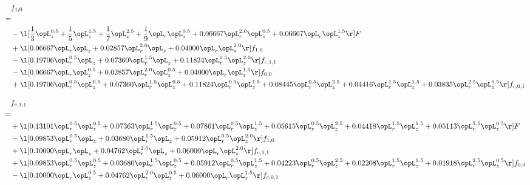 \begin{alignat}{2} 
\label{eq:f_10_1} 
& f_{1,0} \nonumber \\ 
 = \\ 
& - \l[ \frac{1}{3} \opL_z^{0.5} + \frac{1}{5} \opL_z^{1.5} + \frac{1}{7} \opL_z^{2.5} + \frac{1}{9} \opL_r \opL_z^{0.5} +  0.06667 \opL_r^{2.0} \opL_z^{0.5} +  0.06667 \opL_r \opL_z^{1.5}  \r] F \nonumber \\ 
& + \l[  0.06667 \opL_r \opL_z +  0.02857 \opL_r^{2.0} \opL_z +  0.04000 \opL_r \opL_z^{2.0}  \r] f_{1,0} \nonumber \\ 
& - \l[  0.19706 \opL_r^{0.5} \opL_z +  0.07360 \opL_r^{1.5} \opL_z +  0.11824 \opL_r^{0.5} \opL_z^{2.0}  \r] f_{c,1,1} \nonumber \\ 
& - \l[  0.06667 \opL_r \opL_z^{0.5} +  0.02857 \opL_r^{2.0} \opL_z^{0.5} +  0.04000 \opL_r \opL_z^{1.5}  \r] f_{0,0} \nonumber \\ 
& + \l[  0.19706 \opL_r^{0.5} \opL_z^{0.5} +  0.07360 \opL_r^{1.5} \opL_z^{0.5} +  0.11824 \opL_r^{0.5} \opL_z^{1.5} +  0.08445 \opL_r^{0.5} \opL_z^{2.5} +  0.04416 \opL_r^{1.5} \opL_z^{1.5} +  0.03835 \opL_r^{2.5} \opL_z^{0.5}  \r] f_{c,0,1} \nonumber \\ 
\end{alignat} 


\begin{alignat}{2} 
\label{eq:f_11_1} 
& f_{c,1,1} \nonumber \\ 
 = \\ 
& + \l[  0.13101 \opL_r^{0.5} \opL_z^{0.5} +  0.07363 \opL_r^{1.5} \opL_z^{0.5} +  0.07861 \opL_r^{0.5} \opL_z^{1.5} +  0.05615 \opL_r^{0.5} \opL_z^{2.5} +  0.04418 \opL_r^{1.5} \opL_z^{1.5} +  0.05113 \opL_r^{2.5} \opL_z^{0.5}  \r] F \nonumber \\ 
& - \l[  0.09853 \opL_r^{0.5} \opL_z +  0.03680 \opL_r^{1.5} \opL_z +  0.05912 \opL_r^{0.5} \opL_z^{2.0}  \r] f_{1,0} \nonumber \\ 
& + \l[  0.10000 \opL_r \opL_z +  0.04762 \opL_r^{2.0} \opL_z +  0.06000 \opL_r \opL_z^{2.0}  \r] f_{c,1,1} \nonumber \\ 
& + \l[  0.09853 \opL_r^{0.5} \opL_z^{0.5} +  0.03680 \opL_r^{1.5} \opL_z^{0.5} +  0.05912 \opL_r^{0.5} \opL_z^{1.5} +  0.04223 \opL_r^{0.5} \opL_z^{2.5} +  0.02208 \opL_r^{1.5} \opL_z^{1.5} +  0.01918 \opL_r^{2.5} \opL_z^{0.5}  \r] f_{0,0} \nonumber \\ 
& - \l[  0.10000 \opL_r \opL_z^{0.5} +  0.04762 \opL_r^{2.0} \opL_z^{0.5} +  0.06000 \opL_r \opL_z^{1.5}  \r] f_{c,0,1} \nonumber \\ 
\end{alignat} 


